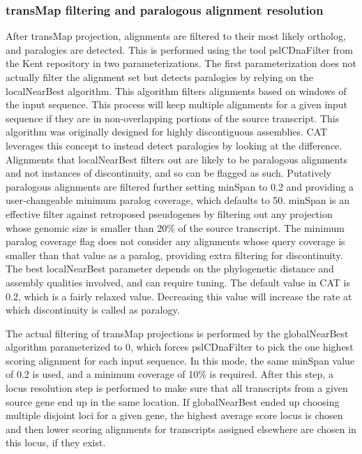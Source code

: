 \documentclass[fleqn,10pt]{wlscirep}
\begin{document}
\subsubsection*{transMap filtering and paralogous alignment resolution}
	After transMap projection, alignments are filtered to their most likely ortholog, and paralogies are detected. This is performed using the tool pslCDnaFilter from the Kent repository in two parameterizations. The first parameterization does not actually filter the alignment set but detects paralogies by relying on the localNearBest algorithm. This algorithm filters alignments based on windows of the input sequence. This process will keep multiple alignments for a given input sequence if they are in non-overlapping portions of the source transcript. This algorithm was originally designed for highly discontiguous assemblies. CAT leverages this concept to instead detect paralogies by looking at the difference. Alignments that localNearBest filters out are likely to be paralogous alignments and not instances of discontinuity, and so can be flagged as such. Putatively paralogous alignments are filtered further setting minSpan to 0.2 and providing a user-changeable minimum paralog coverage, which defaults to 50. minSpan is an effective filter against retroposed pseudogenes by filtering out any projection whose genomic size is smaller than 20\% of the source transcript. The minimum paralog coverage flag does not consider any alignments whose query coverage is smaller than that value as a paralog, providing extra filtering for discontinuity. The best localNearBest parameter depends on the phylogenetic distance and assembly qualities involved, and can require tuning. The default value in CAT is 0.2, which is a fairly relaxed value. Decreasing this value will increase the rate at which discontinuity is called as paralogy.
  
	The actual filtering of transMap projections is performed by the globalNearBest algorithm parameterized to 0, which forces pslCDnaFilter to pick the one highest scoring alignment for each input sequence. In this mode, the same minSpan value of 0.2 is used, and a minimum coverage of 10\% is required. After this step, a locus resolution step is performed to make sure that all transcripts from a given source gene end up in the same location. If globalNearBest ended up choosing multiple disjoint loci for a given gene, the highest average score locus is chosen and then lower scoring alignments for transcripts assigned elsewhere are chosen in this locus, if they exist.
\end{document}
